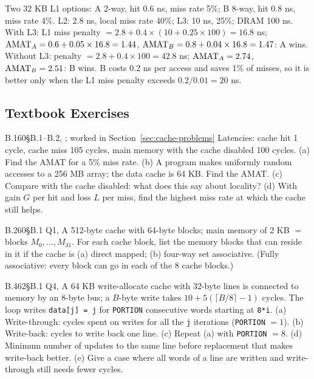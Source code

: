 \begin{eg}
Two 32 KB L1 options: A 2-way, hit 0.6 ns, miss rate 5\%; B 8-way, hit 0.8 ns, miss
rate 4\%. L2: 2.8 ns, local miss rate 40\%; L3: 10 ns, 25\%; DRAM 100 ns.
With L3: L1 miss penalty $=2.8+0.4\times(10+0.25\times100)=16.8$ ns;
$\mathrm{AMAT}_A=0.6+0.05\times16.8=1.44$, $\mathrm{AMAT}_B=0.8+0.04\times16.8=1.47$: A wins.
Without L3: penalty $=2.8+0.4\times100=42.8$ ns; $\mathrm{AMAT}_A=2.74$, $\mathrm{AMAT}_B=2.51$: B
wins. B costs 0.2 ns per access and saves 1\% of misses, so it is better only when
the L1 miss penalty exceeds $0.2/0.01=20$ ns.
\end{eg}

\subsection{Textbook Exercises}
\label{sec:cache-tbx}

\begin{tbexercise}[B]{B.1}{60}{\S B.1--B.2, ; worked in
Section~\ref{sec:cache-problems}}
Latencies: cache hit 1 cycle, cache miss 105 cycles, main memory with the cache
disabled 100 cycles. (a) Find the AMAT for a 5\% miss rate. (b) A program makes
uniformly random accesses to a 256 MB array; the data cache is 64 KB. Find the AMAT.
(c) Compare with the cache disabled: what does this say about locality? (d) With
gain $G$ per hit and loss $L$ per miss, find the highest miss rate at which the
cache still helps.
\end{tbexercise}

\begin{tbexercise}[B]{B.2}{60}{\S B.1 Q1, }
A 512-byte cache with 64-byte blocks; main memory of 2 KB $=$ blocks
$M_0,\dots,M_{31}$. For each cache block, list the memory blocks that can reside
in it if the cache is (a) direct mapped; (b) four-way set associative. (Fully
associative: every block can go in each of the 8 cache blocks.)
\end{tbexercise}

\begin{tbexercise}[B]{B.4}{62}{\S B.1 Q4, }
A 64 KB write-allocate cache with 32-byte lines is connected to memory by an
8-byte bus; a $B$-byte write takes $10+5(\lceil B/8\rceil-1)$ cycles. The loop
writes \texttt{data[j] = j} for \texttt{PORTION} consecutive words starting at
\texttt{8*i}. (a) Write-through: cycles spent on writes for all the \texttt{j}
iterations (\texttt{PORTION} $=1$). (b) Write-back: cycles to write back one line.
(c) Repeat (a) with \texttt{PORTION} $=8$. (d) Minimum number of updates to the same
line before replacement that makes write-back better. (e) Give a case where all
words of a line are written and write-through still needs fewer cycles.
\end{tbexercise}


